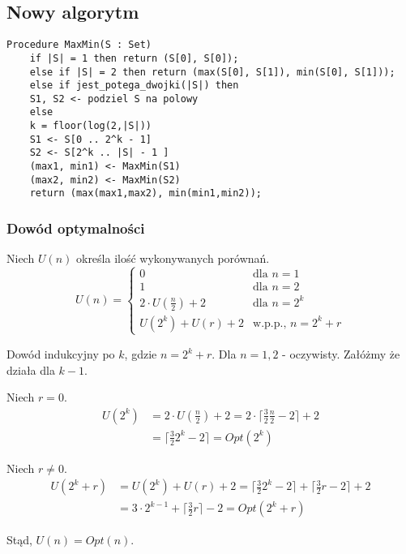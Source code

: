\documentclass[a4paper,11pt]{article}
\begin{document}
\subsection{Nowy algorytm}

\begin{lstlisting}[frame=single]
 Procedure MaxMin(S : Set)
    if |S| = 1 then return (S[0], S[0]);
    else if |S| = 2 then return (max(S[0], S[1]), min(S[0], S[1]));
    else if jest_potega_dwojki(|S|) then
	S1, S2 <- podziel S na polowy
    else
	k = floor(log(2,|S|))
	S1 <- S[0 .. 2^k - 1]
	S2 <- S[2^k .. |S| - 1 ]
    (max1, min1) <- MaxMin(S1)
    (max2, min2) <- MaxMin(S2)
    return (max(max1,max2), min(min1,min2));
\end{lstlisting}

\subsubsection{Dowód optymalności}
Niech $U(n)$ określa ilość wykonywanych porównań.
\begin{equation}
 U(n) = \begin{cases}
         0	& \text{dla $n=1$} \\
         1	& \text{dla $n=2$} \\
         2 \cdot U(\frac{n}{2}) + 2	& \text{dla $n=2^k$} \\
         U(2^k) + U(r) + 2 		& \text{w.p.p., $n = 2^k + r$}
        \end{cases}
\end{equation}

Dowód indukcyjny po $k$, gdzie $n = 2^k + r$.
Dla $n = 1,2$ - oczywisty.
Załóżmy że działa dla $k-1$.

Niech $r = 0$.
\begin{align}
 U(2^k) &= 2 \cdot U( \frac{n}{2} ) + 2 = 2 \cdot \lceil \frac{3}{2} \frac{n}{2} - 2 \rceil + 2 \\
 &= \lceil \frac{3}{2} 2^k - 2 \rceil = Opt(2^k)
\end{align}

Niech $r \neq 0$.
\begin{align}
 U(2^k + r) &= U(2^k) + U(r) + 2 = \lceil \frac{3}{2} 2^k - 2 \rceil + \lceil \frac{3}{2} r - 2 \rceil + 2 \\
 &= 3 \cdot 2^{k-1} + \lceil \frac{3}{2} r \rceil - 2 = Opt(2^k + r)
\end{align}

Stąd, $U(n) = Opt(n)$.
\end{document}
